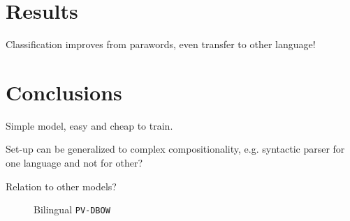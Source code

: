 \documentclass[a4paper,11pt]{article}
\begin{document}
\section*{Results}

Classification improves from parawords, even transfer to other language!



\section*{Conclusions}
Simple model, easy and cheap to train. 

Set-up can be generalized to complex compositionality, e.g. syntactic parser for one language and not for other?

Relation to other models?


\begin{figure}

\center

\caption{Bilingual {\tt PV-DBOW}}
\label{f:bilingual_dbow}
\end{figure}








\end{document}
